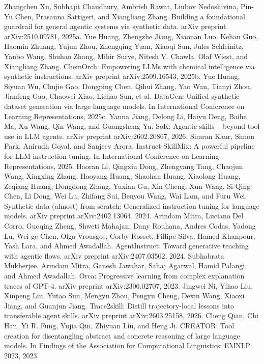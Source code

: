 Zhangchen Xu, Subhajit Chaudhury, Ambrish Rawat, Liubov Nedoshivina, Pin-Yu Chen, Prasanna
Sattigeri, and Xiangliang Zhang. Building a foundational guardrail for general agentic systems via
synthetic data. arXiv preprint arXiv:2510.09781, 2025a.
Yue Huang, Zhengzhe Jiang, Xiaonan Luo, Kehan Guo, Haomin Zhuang, Yujun Zhou, Zhengqing
Yuan, Xiaoqi Sun, Jules Schleinitz, Yanbo Wang, Shuhao Zhang, Mihir Surve, Nitesh V. Chawla,
Olaf Wiest, and Xiangliang Zhang. ChemOrch: Empowering LLMs with chemical intelligence via
synthetic instructions. arXiv preprint arXiv:2509.16543, 2025b.
Yue Huang, Siyuan Wu, Chujie Gao, Dongping Chen, Qihui Zhang, Yao Wan, Tianyi Zhou, Jianfeng
Gao, Chaowei Xiao, Lichao Sun, et al. DataGen: Unified synthetic dataset generation via large
language models. In International Conference on Learning Representations, 2025c.
Yanna Jiang, Delong Li, Haiyu Deng, Baihe Ma, Xu Wang, Qin Wang, and Guangsheng Yu. SoK:
Agentic skills – beyond tool use in LLM agents. arXiv preprint arXiv:2602.20867, 2026.
Simran Kaur, Simon Park, Anirudh Goyal, and Sanjeev Arora. Instruct-SkillMix: A powerful pipeline
for LLM instruction tuning. In International Conference on Learning Representations, 2025.
Haoran Li, Qingxiu Dong, Zhengyang Tang, Chaojun Wang, Xingxing Zhang, Haoyang Huang,
Shaohan Huang, Xiaolong Huang, Zeqiang Huang, Dongdong Zhang, Yuxian Gu, Xin Cheng,
Xun Wang, Si-Qing Chen, Li Dong, Wei Lu, Zhifang Sui, Benyou Wang, Wai Lam, and Furu Wei.
Synthetic data (almost) from scratch: Generalized instruction tuning for language models. arXiv
preprint arXiv:2402.13064, 2024.
Arindam Mitra, Luciano Del Corro, Guoqing Zheng, Shweti Mahajan, Dany Rouhana, Andres Codas,
Yadong Lu, Wei ge Chen, Olga Vrousgos, Corby Rosset, Fillipe Silva, Hamed Khanpour, Yash
Lara, and Ahmed Awadallah. AgentInstruct: Toward generative teaching with agentic flows. arXiv
preprint arXiv:2407.03502, 2024.
Subhabrata Mukherjee, Arindam Mitra, Ganesh Jawahar, Sahaj Agarwal, Hamid Palangi, and Ahmed
Awadallah. Orca: Progressive learning from complex explanation traces of GPT-4. arXiv preprint
arXiv:2306.02707, 2023.
Jingwei Ni, Yihao Liu, Xinpeng Liu, Yutao Sun, Mengyu Zhou, Pengyu Cheng, Dexin Wang, Xiaoxi
Jiang, and Guanjun Jiang. Trace2skill: Distill trajectory-local lessons into transferable agent skills.
arXiv preprint arXiv:2603.25158, 2026.
Cheng Qian, Chi Han, Yi R. Fung, Yujia Qin, Zhiyuan Liu, and Heng Ji. CREATOR: Tool creation
for disentangling abstract and concrete reasoning of large language models. In Findings of the
Association for Computational Linguistics: EMNLP 2023, 2023.
